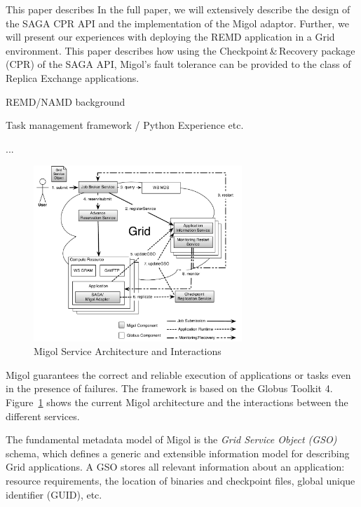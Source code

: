 \documentclass[times, 10pt,twocolumn]{article}
\begin{document}
This paper describes In the full paper, we will extensively  describe the design of the SAGA CPR API and the implementation 
of the Migol adaptor. Further, we will present our experiences with deploying  
the REMD application in a Grid environment.
This paper describes how using the Checkpoint\,\&\,Recovery package
(CPR) of the SAGA API, Migol's fault tolerance can be provided to the
class of Replica Exchange applications.   
 

REMD/NAMD background

Task management framework  / Python Experience etc.

...                                  


\label{sec:migol}

\begin{figure}[t]
            \centering
                \includegraphics[width=0.7\textwidth]{migol_architecture}
            \caption{Migol Service Architecture and Interactions}
            \label{fig:migol_architecture}
\end{figure}           


Migol guarantees the correct and reliable exe\-cution of applications or tasks even in
the presence of  failures. The framework is based on the Globus Toolkit 4. 
Figure~\ref{fig:migol_architecture} shows the current Migol architecture and 
the interactions between the different services.

The fundamental metadata model of Migol is the \emph{Grid Service Object (GSO)} schema,
which defines a generic and extensible information model for
describing Grid applications.  
A GSO stores all relevant information about an application: resource requirements,
the location of binaries and checkpoint files, global unique identifier (GUID),
etc.
\end{document}
